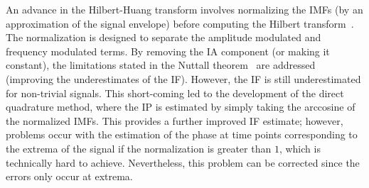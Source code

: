 \documentclass[a4paper]{IEEEtran}
\begin{document}
An advance in the Hilbert-Huang transform involves normalizing the IMFs (by an approximation of the signal envelope) before computing the Hilbert transform~\cite{Huang2005}. The normalization is designed to separate the amplitude modulated and frequency modulated terms. By removing the IA component (or making it constant), the limitations stated in the Nuttall theorem~\cite{Nuttall1966} are addressed (improving the underestimates of the IF). However, the IF is still underestimated for non-trivial signals. This short-coming led to the development of the direct quadrature method, where the IP is estimated by simply taking the arccosine of the normalized IMFs. This provides a further improved IF estimate; however, problems occur with the estimation of the phase at time points corresponding to the extrema of the signal if the normalization is greater than $1$, which is technically hard to achieve. Nevertheless, this problem can be corrected since the errors only occur at extrema.
\end{document}
